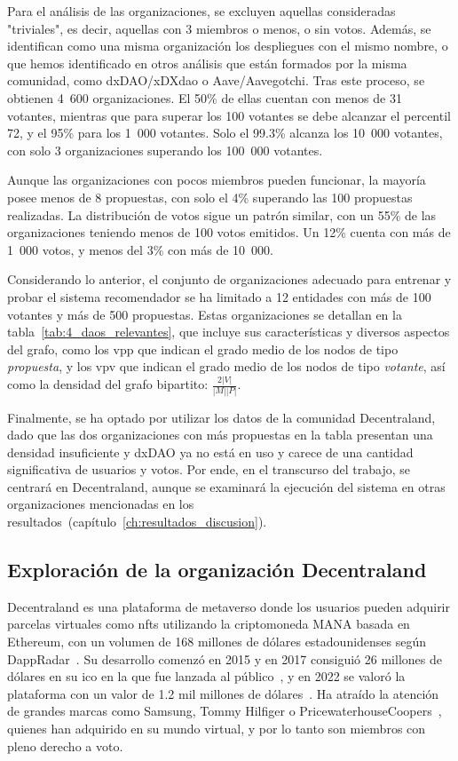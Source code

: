 Para el análisis de las organizaciones, se excluyen aquellas consideradas "triviales", es decir, aquellas con 3 miembros o menos, o sin votos. Además, se identifican como una misma organización los despliegues con el mismo nombre, o que hemos identificado en otros análisis que están formados por la misma comunidad, como dxDAO/xDXdao o Aave/Aavegotchi. Tras este proceso, se obtienen 4~600 organizaciones. El 50\% de ellas cuentan con menos de 31 votantes, mientras que para superar los 100 votantes se debe alcanzar el percentil 72, y el 95\% para los 1~000 votantes. Solo el 99.3\% alcanza los 10~000 votantes, con solo 3 organizaciones superando los 100~000 votantes.

Aunque las organizaciones con pocos miembros pueden funcionar, la mayoría posee menos de 8 propuestas, con solo el 4\% superando las 100 propuestas realizadas. La distribución de votos sigue un patrón similar, con un 55\% de las organizaciones teniendo menos de 100 votos emitidos. Un 12\% cuenta con más de 1~000 votos, y menos del 3\% con más de 10~000.

Considerando lo anterior, el conjunto de organizaciones adecuado para entrenar y probar el sistema recomendador se ha limitado a 12 entidades con más de 100 votantes y más de 500 propuestas. Estas organizaciones se detallan en la tabla~\ref{tab:4_daos_relevantes}, que incluye sus características y diversos aspectos del grafo, como los \gls{vpp} que indican el grado medio de los nodos de tipo \textit{propuesta}, y los \gls{vpv} que indican el grado medio de los nodos de tipo \textit{votante}, así como la densidad del grafo bipartito: $\frac{2|V|}{|M||P|}$. 

Finalmente, se ha optado por utilizar los datos de la comunidad Decentraland, dado que las dos organizaciones con más propuestas en la tabla presentan una densidad insuficiente y dxDAO ya no está en uso y carece de una cantidad significativa de usuarios y votos. Por ende, en el transcurso del trabajo, se centrará en Decentraland, aunque se examinará la ejecución del sistema en otras organizaciones mencionadas en los resultados~(capítulo~\ref{ch:resultados_discusion}).

\subsection{Exploración de la organización Decentraland}

Decentraland es una plataforma de metaverso donde los usuarios pueden adquirir parcelas virtuales como \glspl{nft} utilizando la criptomoneda MANA basada en Ethereum, con un volumen de 168 millones de dólares estadounidenses según DappRadar~\cite{dappradar_decentraland_2024}. Su desarrollo comenzó en 2015 y en 2017 consiguió 26 millones de dólares en su \gls{ico} en la que fue lanzada al público~\cite{higgins_26_2017}, y en 2022 se valoró la plataforma con un valor de 1.2 mil millones de dólares~\cite{tangermann_12_2022}. Ha atraído la atención de grandes marcas como Samsung, Tommy Hilfiger o PricewaterhouseCoopers~\cite{decentraland_decentraland_2024}, quienes han adquirido  en su mundo virtual, y por lo tanto son miembros con pleno derecho a voto.

